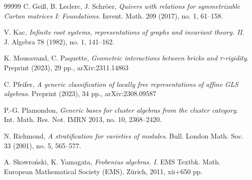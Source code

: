 \documentclass[12pt,reqno]{amsart}
\theoremstyle{definition}
\begin{document}
\begin{thebibliography}{99999}
C. Gei{\ss}, B. Leclerc, J. Schr\"oer,
\emph{Quivers with relations for symmetrizable Cartan matrices I: Foundations}.
Invent. Math. 209 (2017), no. 1, 61--158.

V. Kac,
\emph{Infinite root systems, representations of graphs and invariant theory. II}.
J. Algebra 78 (1982), no. 1, 141--162.


K. Mousavand, C. Paquette,
\emph{Geometric interactions between bricks and $\tau$-rigidity}.
Preprint (2023), 29 pp.,
arXiv:2311.14863


C. Pfeifer,
\emph{A generic classification of locally free representations of
affine GLS algebras}.
Preprint (2023), 34 pp., arXiv:2308.09587

P.-G. Plamondon,
\emph{Generic bases for cluster algebras from the cluster category}.
Int. Math. Res. Not. IMRN 2013, no. 10, 2368--2420.

N. Richmond,
\emph{A stratification for varieties of modules}.
Bull. London Math. Soc. 33 (2001), no. 5, 565--577.

A. Skowro\'nski, K. Yamagata,
\emph{Frobenius algebras. I}.
EMS Textbk. Math.
European Mathematical Society (EMS), Z\"urich, 2011, xii+650 pp.

\end{thebibliography}
\end{document}
